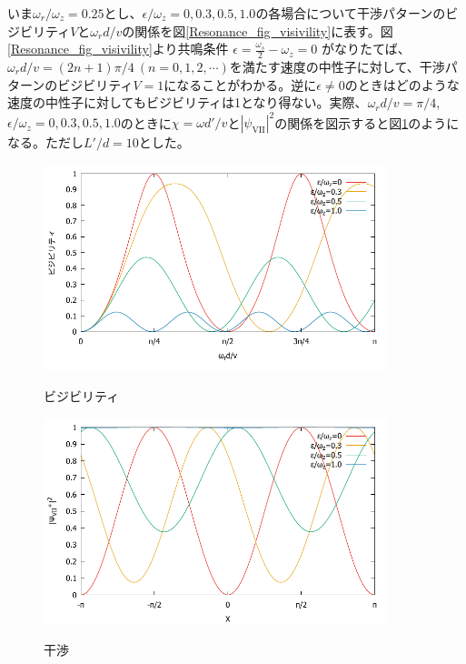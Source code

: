 いま$\omega_r/\omega_z=0.25$とし、$\epsilon/\omega_z=0,0.3,0.5,1.0$の各場合について干渉パターンのビジビリティ$V$と$\omega_r d/v$の関係を図\ref{Resonance_fig_visivility}に表す。図\ref{Resonance_fig_visivility}より共鳴条件
$
\epsilon=\frac{\omega_s}{2}-\omega_z=0 \label{Resonance_resonance}
$
がなりたてば、$\omega_r d/v =(2n+1)\pi/4 \ (n =0,1,2,\cdots)$を満たす速度の中性子に対して、干渉パターンのビジビリティ$V=1$になることがわかる。逆に$\epsilon \neq 0$のときはどのような速度の中性子に対してもビジビリティは1となり得ない。実際、$\omega_rd/v=\pi/4$,$\epsilon/\omega_z=0,0.3,0.5,1.0$のときに$\chi=\omega d'/v$と$|\psi_\mathrm{VII}|^2$の関係を図示すると図\ref{Resonance_fig_interference}のようになる。ただし$L'/d=10$とした。

\begin{figure}[h]
\begin{center}
\includegraphics[width=10cm]{resonance/whatwhyhow/resonance_visivility1.pdf}
\caption{ビジビリティ}
\label{Resonance_fig_visivility}
\includegraphics[width=10cm]{resonance/whatwhyhow/resonance_interference1.pdf}
\caption{干渉}
\label{Resonance_fig_interference}
\end{center}
\end{figure}

